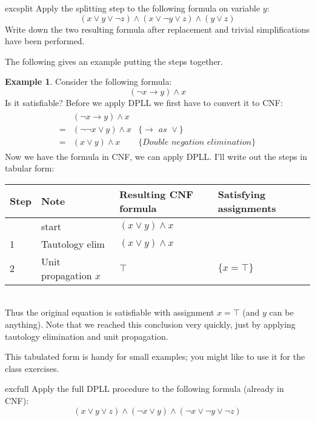 \documentclass{article}
\theoremstyle{definition}
\newtheorem{example}{Example}
\begin{document}
\begin{restatable}{exc}{split}
Apply the splitting step to the following formula on variable $y$:
%
\begin{equation*}
(x \vee y \vee \neg z) \wedge (x \vee \neg y \vee z) \wedge (y \vee z)
\end{equation*}
%
Write down the two resulting formula after replacement and trivial
simplifications have been performed.
\end{restatable}

The following gives an example putting the steps together.

\begin{example}
  Consider the following formula:
  $$(\neg x \rightarrow y) \wedge x$$
  Is it satisfiable? Before we apply DPLL we first have to 
convert it to CNF:
   \begin{align*}
      \begin{array}{lll}
        & (\neg x \rightarrow y) \wedge x & \\
      = & (\neg \neg x \vee y) \wedge x & \textit{\{$\rightarrow$ as
                                          $\vee$\}} \\
      = & (x \vee y) \wedge x & \textit{\{Double negation elimination}\}
      \end{array}
    \end{align*}
  Now we have the formula in CNF, we can apply DPLL. I'll write out
  the steps in tabular form: \\[1em]
%
  \vspace{2em}
  \begin{tabular}{l|l|l|l}
    Step & Note & Resulting CNF formula & Satisfying assignments \\ \hline
      & start & $(x \vee y) \wedge x$ &  \\
    1 & Tautology elim & $(x \vee y) \wedge x$ &  \\
    2 & Unit propagation $x$ & $\top$ & $\{x = \top\}$
  \end{tabular} \\
  Thus the original equation is satisfiable with assignment $x = \top$
  (and $y$ can be anything). Note that we reached this conclusion very quickly,
  just by applying tautology elimination and unit propagation.

This tabulated form is handy for small examples; you might like
to use it for the class exercises.
\end{example}

\begin{restatable}{exc}{full}
Apply the full DPLL procedure to the following formula (already
in CNF):
%
\begin{equation*}
(x \vee y \vee z)
\wedge (\neg x \vee y)
\wedge (\neg x \vee \neg y \vee \neg z)
\end{equation*}
\end{restatable}
\end{document}
